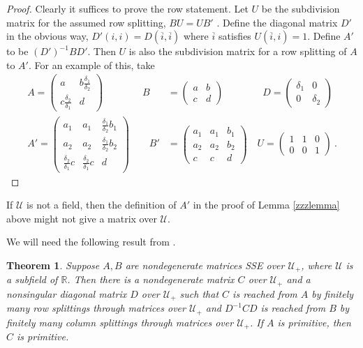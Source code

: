 \documentclass{amsart}
\newtheorem{theorem}{Theorem}[section]
\theoremstyle{definition}
\theoremstyle{remark}
\numberwithin{equation}{section}
\begin{document}
{{\begin{proof}
Clearly it suffices to prove the row statement. Let $U$ be 
the subdivision matrix for the assumed row splitting,
$BU=UB' $ .  Define the diagonal matrix $D'$ in the obvious 
way, $D'(i,i)=D(\overline i, \overline i)$ where $\overline i$
satisfies $U(\overline i,i)=1$. 
Define 
 $A'$ to be 
 $(D')^{-1}BD'$. Then $U$ is also 
the subdivision matrix for a row splitting of 
$A$ to $A' $. For an example of this, take 
\begin{align*} 
A= 
\begin{pmatrix} a & b\frac{\delta_1}{\delta_2 }\\ 
c\frac{\delta_2}{\delta_1 } & d \end{pmatrix} 
\qquad \quad \quad 
B&= 
\begin{pmatrix} a & b \\ c & d \end{pmatrix} 
\quad \quad \qquad  
D= 
\begin{pmatrix} \delta_1 & 0 \\ 0 & \delta_2 \end{pmatrix} 
\\
A'=\begin{pmatrix} a_1 & a_1 & \frac{\delta_1}{\delta_2 }b_1 
\\ a_2 &a_2&\frac{\delta_1}{\delta_2 } b_2 \\ 
\frac{\delta_2}{\delta_1 }c &\frac{\delta_2}{\delta_1 }c & d \end{pmatrix} 
\quad \quad 
B'&= 
\begin{pmatrix} a_1 & a_1 & b_1 \\ a_2 &a_2 &b_2 \\ c &c & d \end{pmatrix} 
 \quad 
U= 
\begin{pmatrix} 1 & 1 &0 \\ 
0 & 0& 1 \end{pmatrix} \ . 
\end{align*}
 \end{proof}
If $\mathcal U$ is not a field, then the definition of $A'$  
in the proof of Lemma \ref{zzzlemma} above might not 
give a matrix over $ \mathcal U$. 


We will need the following result from \cite{KR3}. 

\begin{theorem} \label{easystreet}
 Suppose $A,B$ are nondegenerate 
matrices SSE over $\mathcal U_+$, where $\mathcal U$ 
is a subfield of $\mathbb R$. Then there is a
 nondegenerate matrix $C$ over $\mathcal U_+$ and 
a nonsingular diagonal matrix $D$ over $\mathcal U_+$ 
such that $C$ is reached from $A$ by finitely many row splittings 
through  matrices over $\mathcal U_+$ and 
 $D^{-1}CD$ is reached from $B$ by finitely many column splittings 
through  matrices over $\mathcal U_+$.
 If $A$ is primitive, then $C$ is primitive. 
\end{theorem} 

}}
\end{document}
